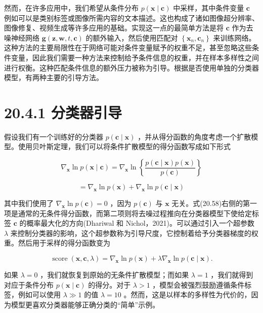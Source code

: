 \documentclass[10pt]{report}
\begin{document}
然而，在许多应用中，我们希望从条件分布 \(p\left( {\mathbf{x} \mid  \mathbf{c}}\right)\) 中采样，其中条件变量 \(\mathbf{c}\) 例如可以是类别标签或图像所需内容的文本描述。这也构成了诸如图像超分辨率、图像修复、视频生成等许多应用的基础。实现这一点的最简单方法是将 \(\mathbf{c}\) 作为去噪神经网络 \(\mathbf{g}\left( {\mathbf{z},\mathbf{w},t,\mathbf{c}}\right)\) 的额外输入，然后使用匹配对 \(\left\{  {{\mathbf{x}}_{n},{\mathbf{c}}_{n}}\right\}\) 来训练网络。这种方法的主要局限性在于网络可能对条件变量赋予的权重不足，甚至忽略这些条件变量，因此我们需要一种方法来控制给予条件信息的权重，并在样本多样性之间进行权衡。这种匹配条件信息的额外压力被称为引导。根据是否使用单独的分类器模型，有两种主要的引导方法。

\section*{20.4.1 分类器引导}

假设我们有一个训练好的分类器 \(p\left( {\mathbf{c} \mid  \mathbf{x}}\right)\) ，并从得分函数的角度考虑一个扩散模型。使用贝叶斯定理，我们可以将条件扩散模型的得分函数写成如下形式

\[
{\nabla }_{\mathbf{x}}\ln p\left( {\mathbf{x} \mid  \mathbf{c}}\right)  = {\nabla }_{\mathbf{x}}\ln \left\{  \frac{p\left( {\mathbf{c} \mid  \mathbf{x}}\right) p\left( \mathbf{x}\right) }{p\left( \mathbf{c}\right) }\right\}
\]

\[
= {\nabla }_{\mathbf{x}}\ln p\left( \mathbf{x}\right)  + {\nabla }_{\mathbf{x}}\ln p\left( {\mathbf{c} \mid  \mathbf{x}}\right)  \tag{20.58}
\]

其中我们使用了 \({\nabla }_{\mathbf{x}}\ln p\left( \mathbf{c}\right)  = 0\) ，因为 \(p\left( \mathbf{c}\right)\) 与 \(\mathbf{x}\) 无关。式(20.58)右侧的第一项是通常的无条件得分函数，而第二项则将去噪过程推向在分类器模型下使给定标签 \(\mathbf{c}\) 的概率最大化的方向(Dhariwal 和 Nichol，2021)。可以通过引入一个超参数 \(\lambda\) 来控制分类器的影响，这个超参数称为引导尺度，它控制着给予分类器梯度的权重。然后用于采样的得分函数变为

\[
\operatorname{score}\left( {\mathbf{x},\mathbf{c},\lambda }\right)  = {\nabla }_{\mathbf{x}}\ln p\left( \mathbf{x}\right)  + \lambda {\nabla }_{\mathbf{x}}\ln p\left( {\mathbf{c} \mid  \mathbf{x}}\right) . \tag{20.59}
\]

如果 \(\lambda  = 0\) ，我们就恢复到原始的无条件扩散模型；而如果 \(\lambda  = 1\) ，我们就得到对应于条件分布 \(p\left( {\mathbf{x} \mid  \mathbf{c}}\right)\) 的得分。对于 \(\lambda  > 1\) ，模型会被强烈鼓励遵循条件标签，例如可以使用 \(\lambda  \gg  1\) 的值 \(\lambda  = {10}\) 。然而，这是以样本的多样性为代价的，因为模型更喜欢分类器能够正确分类的“简单”示例。
\end{document}
